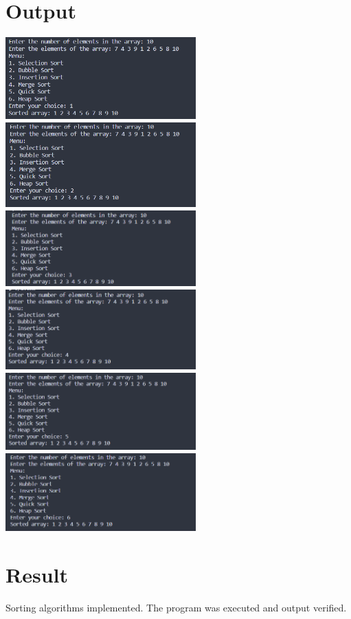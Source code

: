 \section{Output}
\includegraphics[width=0.55\textwidth]{Cycle_2/Outputs/Sort1.png}
\includegraphics[width=0.55\textwidth]{Cycle_2/Outputs/Sort2.png}
\includegraphics[width=0.55\textwidth]{Cycle_2/Outputs/Sort3.png}
\includegraphics[width=0.55\textwidth]{Cycle_2/Outputs/Sort4.png}
\includegraphics[width=0.55\textwidth]{Cycle_2/Outputs/Sort5.png}
\includegraphics[width=0.55\textwidth]{Cycle_2/Outputs/Sort6.png}

\section{Result}
Sorting algorithms implemented. The program was executed and output verified.